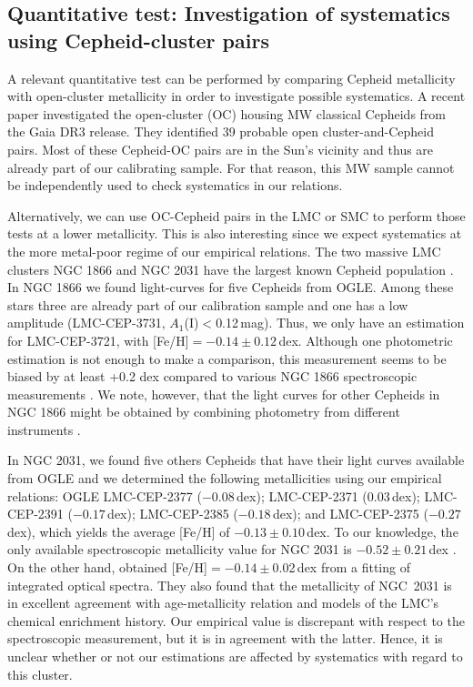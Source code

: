 \documentclass[article]{aa} %
\begin{document}
\subsection{Quantitative test: Investigation of systematics using Cepheid-cluster pairs}
A relevant quantitative test can be performed by comparing Cepheid metallicity with open-cluster metallicity in order to investigate possible systematics. A recent paper investigated the open-cluster (OC) housing MW classical Cepheids \citep{Hao2022} from the Gaia DR3 release. They identified 39 probable open cluster-and-Cepheid pairs. Most of these Cepheid-OC pairs are in the Sun's vicinity and thus are already part of our calibrating sample. For that reason, this MW sample cannot be independently used to check systematics in our relations.

Alternatively, we can use OC-Cepheid pairs in the LMC or SMC to perform those tests at a lower metallicity. This is also interesting since we expect systematics at the more metal-poor regime of our empirical relations. The two massive LMC clusters NGC 1866 and NGC 2031 have the largest known Cepheid population \citep{WelchStetson1993,Testa2007,Musella2016}. In NGC 1866 we found light-curves for five Cepheids from OGLE. Among these stars three are already part of our calibration sample \citep{Lemasle2017} and one has a low amplitude (LMC-CEP-3731, $A_1$(I)$<$0.12$\,$mag). Thus, we only have an estimation for LMC-CEP-3721, with [Fe/H]$=-0.14\pm0.12\,$dex. Although one photometric estimation is not enough to make a comparison, this measurement seems to be biased by at least +0.2 dex compared to various NGC 1866 spectroscopic measurements \citep[see][]{Lemasle2017}. We note, however, that the light curves for other Cepheids in NGC 1866 might be obtained by combining photometry from different instruments \citep[see][]{Musella2016}.

In NGC 2031, we found five others Cepheids that have their light curves available from OGLE and we determined the following metallicities using our empirical relations: OGLE LMC-CEP-2377 ($-0.08\,$dex);
LMC-CEP-2371 (0.03$\,$dex);
LMC-CEP-2391 ($-0.17\,$dex);
LMC-CEP-2385 ($-0.18\,$dex);
and LMC-CEP-2375 ($-0.27\,$dex), which yields the average [Fe/H] of $-0.13\pm0.10\,$dex.
To our knowledge, the only available spectroscopic metallicity value for NGC 2031 is $-0.52\pm0.21\,$dex \citep{Dirsch2000}. On the other hand, \cite{Chilingarian2018} obtained [Fe/H]$=-0.14\pm$0.02$\,$dex from a fitting of integrated optical spectra. They also found that the metallicity of NGC~2031 is in excellent agreement with age-metallicity relation and models of the LMC's chemical enrichment history. Our empirical value is discrepant with respect to the spectroscopic measurement, but it is in agreement with the latter. Hence, it is unclear whether or not our estimations are affected by systematics with regard to this cluster.
\end{document}
